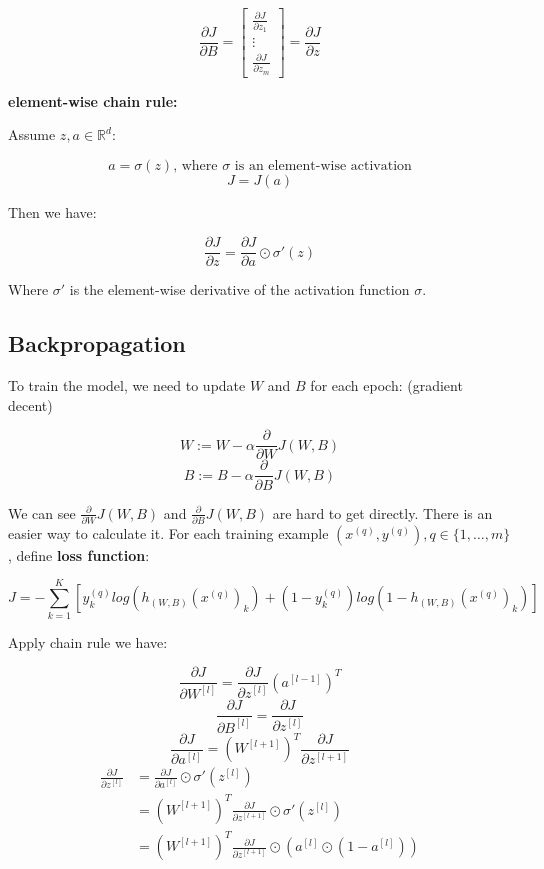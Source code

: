 \documentclass{article}
\begin{document}
\[
\frac{\partial J}{\partial B} = 
\begin{bmatrix}
\frac{\partial J}{\partial z_1}\\
\vdots\\
\frac{\partial J}{\partial z_m}
\end{bmatrix}
= \frac{\partial J}{\partial z}
\]

\noindent \textbf{element-wise chain rule:}

\noindent Assume \(z, a \in \mathbb{R}^d\):

\[a = \sigma(z) \text{, where \(\sigma\) is an element-wise activation}\]
\[J = J(a)\]

\noindent Then we have:

\[\frac{\partial J}{\partial z} = \frac{\partial J}{\partial a} \odot \sigma'(z)\]

\noindent Where \(\sigma'\) is the element-wise derivative of the activation function \(\sigma\).

\subsection{Backpropagation}

\noindent To train the model, we need to update \(W\) and \(B\) for each epoch: (gradient decent)

\[W := W - \alpha  \frac{\partial}{\partial W} J(W, B)\]
\[B := B - \alpha  \frac{\partial}{\partial B} J(W, B)\]

\noindent We can see \(\frac{\partial}{\partial W} J(W, B)\) and \(\frac{\partial}{\partial B} J(W, B)\) are hard to get directly. There is an easier way to calculate it. For each training example \((x^{(q)}, y^{(q)}), q \in \{1, \dots, m\}\), define \textbf{loss function}:

\[J = -\sum_{k = 1}^{K} [y^{(q)}_k log(h_{(W, B)} (x^{(q)})_k) + (1 - y^{(q)}_k) log(1 - h_{(W, B)}(x^{(q)})_k)] \]

\noindent Apply chain rule we have:

\[\frac{\partial J}{\partial W^{[l]}} = \frac{\partial J}{\partial z^{[l]}} (a^{[l - 1]})^T\]
\[\frac{\partial J}{\partial B^{[l]}} = \frac{\partial J}{\partial z^{[l]}}\]
\[\frac{\partial J}{\partial a^{[l]}} = (W^{[l + 1]})^T \frac{\partial J}{\partial z^{[l + 1]}}\]
\begin{equation*}
\begin{split}
\frac{\partial J}{\partial z^{[l]}}
& = \frac{\partial J}{\partial a^{[l]}} \odot \sigma'(z^{[l]}) \\
& = (W^{[l + 1]})^T \frac{\partial J}{\partial z^{[l + 1]}} \odot \sigma'(z^{[l]}) \\
& = (W^{[l + 1]})^T \frac{\partial J}{\partial z^{[l + 1]}} \odot (a^{[l]} \odot (1 - a^{[l]}))
\end{split}
\end{equation*}
\end{document}
